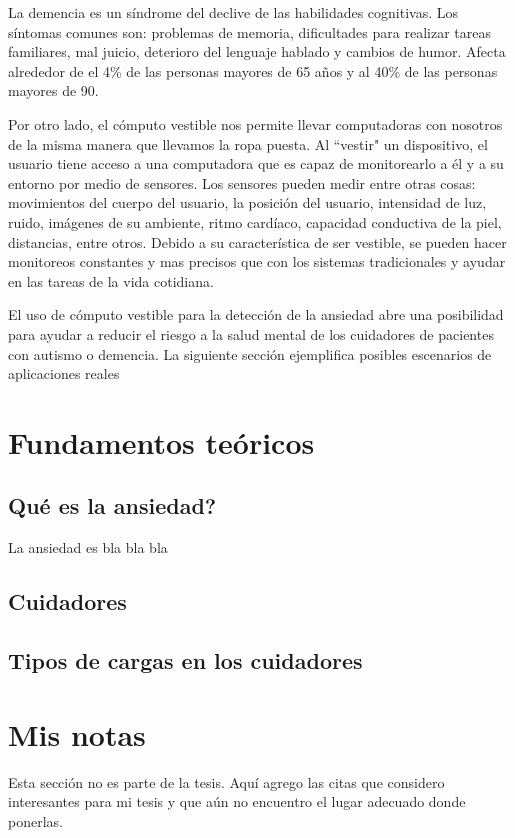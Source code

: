 \documentclass[letterpaper,12pt]{cicese}
\begin{document}
La demencia es un s\'indrome del declive de las habilidades cognitivas. Los s\'intomas comunes son: problemas de memoria, dificultades para realizar tareas familiares, mal juicio, deterioro del lenguaje hablado y cambios de humor\citep{Aziz}. Afecta alrededor de el 4\% de las personas mayores de 65 a\~nos y al 40\% de las personas mayores de 90.

                        Por otro lado, el c\'omputo vestible nos permite llevar computadoras con nosotros de la misma manera que llevamos la ropa puesta. Al ``vestir" un dispositivo,
                        el usuario tiene acceso a una computadora que es capaz de monitorearlo a \'el y a su entorno por medio de sensores. Los sensores pueden medir entre
                        otras cosas: movimientos del cuerpo del usuario, la posici\'on del usuario, intensidad de luz, ruido, im\'agenes de su ambiente, ritmo card\'iaco, capacidad
                        conductiva de la piel, distancias, entre otros. Debido a su caracter\'istica de ser vestible, se pueden hacer monitoreos constantes y mas precisos que con
                        los sistemas tradicionales y ayudar en las tareas de la vida cotidiana.

                        El uso de c\'omputo vestible para la detecci\'on de la ansiedad abre una posibilidad para ayudar a reducir el riesgo a la salud mental
                        de los cuidadores de pacientes con autismo o demencia. La siguiente secci\'on ejemplifica posibles escenarios de aplicaciones reales

	\chapter{Fundamentos te\'oricos}
	\section{Qu\'e es la ansiedad?}
			La ansiedad es bla bla bla
			\section{Cuidadores}
		
			\section{Tipos de cargas en los cuidadores}


	\newpage
		\chapter{Mis notas}
			Esta secci\'on no es parte de la tesis. Aqu\'i agrego las citas que considero interesantes para mi tesis y que a\'un no encuentro el lugar adecuado donde ponerlas.
\end{document}
